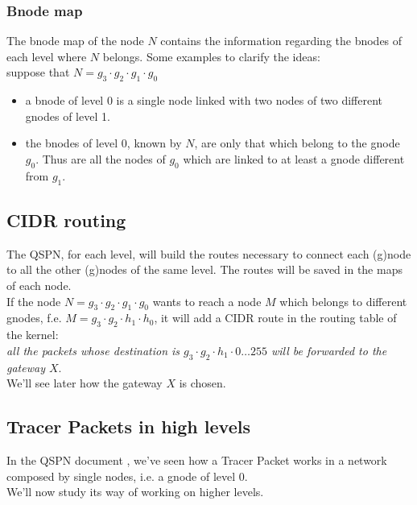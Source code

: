 \documentclass[a4paper]{article}
\begin{document}
\subsubsection{Bnode map}
The bnode map of the node $N$  contains the information regarding the bnodes
of each level where $N$ belongs.
Some examples to clarify the ideas:\\

suppose that $N = g_3\cdot g_2\cdot g_1 \cdot g_0$
\begin{itemize}
	\item a bnode of level 0 is a single node linked with two nodes of two
		different gnodes of level 1.
	\item the bnodes of level 0, known by $N$, are only that which belong
		to the gnode $g_0$. Thus are all the nodes of $g_0$ which are
		linked to at least a gnode different from $g_1$.
\end{itemize}

\subsection{CIDR routing}
The QSPN, for each level, will build the routes necessary to connect each
(g)node to all the other (g)nodes of the same level. The routes will be saved
in the maps of each node.\\

If the node $N=g_3\cdot g_2\cdot g_1 \cdot g_0$ wants to reach a node $M$ which
belongs to different gnodes, f.e. $M=g_3\cdot g_2\cdot h_1 \cdot h_0$, it will
add a CIDR\cite{CIDR} route in the routing table of the kernel:\\
\emph{all the packets whose destination is $g_3\cdot g_2\cdot h_1 \cdot 0\dots
255$ will be forwarded to the gateway $X$}.\\

We'll see later how the gateway $X$ is chosen.

\subsection{Tracer Packets in high levels}
In the QSPN document \cite{qspndoc}, we've seen how a Tracer Packet works in a
network composed by single nodes, i.e. a gnode of level 0. \\
We'll now study its way of working on higher levels.
\end{document}
